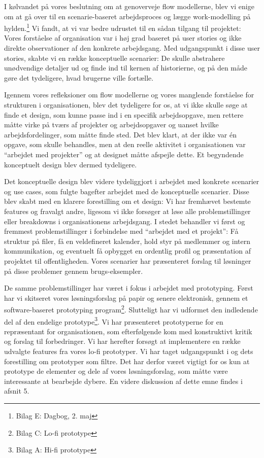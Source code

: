 I kølvandet på vores beslutning om at genoverveje flow modellerne, blev vi enige om at gå over til en scenarie-baseret arbejdsproces og lægge work-modelling på hylden.\footnote{Bilag E: Dagbog, 2. maj} Vi fandt, at vi var bedre udrustet til en sådan tilgang til projektet: Vores forståelse af organisation var i høj grad baseret på user stories og ikke direkte observationer af den konkrete arbejdsgang. Med udgangspunkt i disse user stories, skabte vi en række konceptuelle scenarier: De skulle abstrahere unødvendige detaljer ud og finde ind til kernen af historierne, og på den måde gøre det tydeligere, hvad brugerne ville fortælle. 

Igennem vores refleksioner om flow modellerne og vores manglende forståelse for strukturen i organisationen, blev det tydeligere for os, at vi ikke skulle søge at finde et design, som kunne passe ind i en specifik arbejdsopgave, men rettere måtte virke på tværs af projekter og arbejdsopgaver og uanset hvilke arbejdsfordelinger, som måtte finde sted. Det blev klart, at der ikke var én opgave, som skulle behandles, men at den reelle aktivitet i organisationen var “arbejdet med projekter” og at designet måtte afspejle dette. Et begyndende konceptuelt design blev dermed tydeligere.

Det konceptuelle design blev videre tydeliggjort i arbejdet med konkrete scenarier og use cases, som fulgte bagefter arbejdet med de konceptuelle scenarier. Disse blev skabt med en klarere forestilling om et design: Vi har fremhævet bestemte features og fravalgt andre, ligesom vi ikke forsøger at løse alle problemstillinger eller breakdowns i organisationens arbejdsgang. I stedet behandler vi først og fremmest problemstillinger i forbindelse med “arbejdet med et projekt”: Få struktur på filer, få en veldefineret kalender, hold styr på medlemmer og intern kommunikation, og eventuelt få opbygget en ordentlig profil og præsentation af projektet til offentligheden. Vores scenarier har præsenteret forslag til løsninger på disse problemer gennem brugs-eksempler.

De samme problemstillinger har været i fokus i arbejdet med prototyping. Først har vi skitseret vores løsningsforslag på papir og senere elektronisk, gennem et software-baseret prototyping program\footnote{Bilag C: Lo-fi prototype}. Slutteligt har vi udformet den indledende del af den endelige prototype\footnote{Bilag A: Hi-fi prototype}. Vi har præsenteret prototyperne for en repræsentant for organisationen, som efterfølgende kom med konstruktivt kritik og forslag til forbedringer. Vi har herefter forsøgt at implementere en række udvalgte features fra vores lo-fi prototyper. Vi har taget udgangspunkt i \citep{Lim} og dets forestilling om prototyper som filtre. Det har derfor været vigtigt for os kun at prototype de elementer og dele af vores løsningsforslag, som måtte være interessante at bearbejde dybere. En videre diskussion af dette emne findes i afsnit 5.

